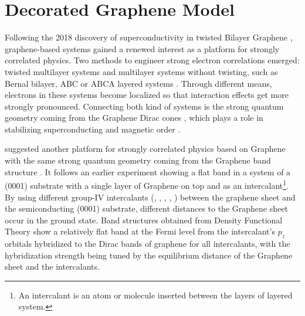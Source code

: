 \documentclass[../notes.tex]{subfiles}
\begin{document}
\raggedbottom

\chapter{Decorated Graphene Model}

Following the 2018 discovery of superconductivity in twisted Bilayer Graphene \cite{caoUnconventionalSuperconductivityMagicangle2018}, graphene-based systems gained a renewed interest as a platform for strongly correlated physics.
Two methods to engineer strong electron correlations emerged: twisted multilayer systems  \cite{caoUnconventionalSuperconductivityMagicangle2018, tanakaSuperfluidStiffnessMagicangle2025, tormaSuperconductivitySuperfluidityQuantum2022, andreiGrapheneBilayersTwist2020, xieTopologyBoundedSuperfluidWeight2020} and multilayer systems without twisting, such as Bernal bilayer, ABC or ABCA layered systems \cite{pantaleonSuperconductivityCorrelatedPhases2023}.
Through different means, electrons in these systems become localized so that interaction effects get more strongly pronounced.
Connecting both kind of systems is the strong quantum geometry coming from the Graphene Dirac cones \cite{wehlingDiracMaterials2014}, which plays a role in stabilizing superconducting \cite{liangBandGeometryBerry2017, tanakaSuperfluidStiffnessMagicangle2025} and magnetic order \cite{abouelkomsanQuantumMetricInduced2023, liuOrbitalMagneticStates2021}.

\citeauthor{wittQuantumGeometryLocal2025} suggested another platform for strongly correlated physics based on Graphene with the same strong quantum geometry coming from the Graphene band structure \cite{wittQuantumGeometryLocal2025}.
It follows an earlier experiment \cite{ghosalElectronicCorrelationsEpitaxial2024} showing a flat band in a system of a (0001) substrate with a single layer of Graphene on top and  as an intercalant\footnote{An intercalant is an atom or molecule inserted between the layers of layered system.}.
By using different group-IV intercalants (, , , , ) between the graphene sheet and the semiconducting (0001) substrate, different distances to the Graphene sheet occur in the ground state.
Band structures obtained from Density Functional Theory show a relatively flat band at the Fermi level from the intercalant’s \(p_z\) orbitals hybridized to the Dirac bands of graphene for all intercalants, with the hybridization strength being tuned by the equilibrium distance of the Graphene sheet and the intercalants.
\end{document}
